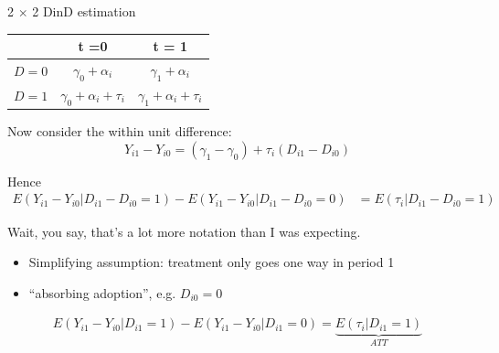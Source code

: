 \documentclass[notes,11pt, aspectratio=169]{beamer}
\newenvironment{wideitemize}{\itemize\addtolength{\itemsep}{10pt}}{\enditemize}
\begin{document}
\begin{frame}{2 $\times$ 2 DinD estimation}
	\begin{center}
		\begin{tabular}{c|cc}
			        & t =0                                   & t = 1                                \\
			\midrule
			$D = 0$ & $\gamma_{0} + \alpha_{i}$              & $ \gamma_{1} + \alpha_{i}$           \\
			$D = 1$ & $ \gamma_{0} + \alpha_{i} + \tau_{i} $ & $\gamma_{1} + \alpha_{i} + \tau_{i}$
		\end{tabular}
	\end{center}
	\begin{wideitemize}
		\item Now consider the within unit difference:
		$$Y_{i1} - Y_{i0} = (\gamma_{1} - \gamma_{0}) + \tau_{i}(D_{i1} - D_{i0})$$
		\item Hence
		\begin{align*}
			E(Y_{i1} - Y_{i0} | D_{i1} - D_{i0} = 1) - E(Y_{i1} - Y_{i0} | D_{i1} - D_{i0} = 0) & = E(\tau_{i}  | D_{i1} - D_{i0} = 1)
		\end{align*}
		\item Wait, you say, that's a lot more notation than I was expecting.
		\begin{itemize}
			\item Simplifying assumption: treatment only goes one way in
			      period 1
			\item  ``absorbing adoption'', e.g. $D_{i0} = 0$
		\end{itemize}
		\begin{align*}
			E(Y_{i1} - Y_{i0} | D_{i1} = 1) - E(Y_{i1} - Y_{i0} | D_{i1} = 0) =  \underbrace{E(\tau_{i}  | D_{i1} = 1) }_{ATT}
		\end{align*}
	\end{wideitemize}
\end{frame}
\end{document}
